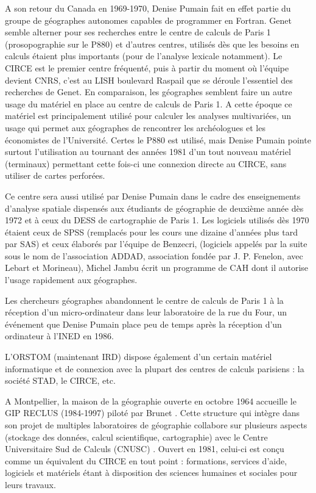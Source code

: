 A son retour du Canada en 1969-1970, Denise Pumain fait en effet partie du groupe de géographes autonomes capables de programmer en Fortran. Genet semble alterner pour ses recherches entre le centre de calculs de Paris 1 (prosopographie sur le P880) et d'autres centres, utilisés dès que les besoins en calculs étaient plus importants (pour de l'analyse lexicale notamment). Le  CIRCE est le premier centre fréquenté, puis à partir du moment où l'équipe devient CNRS, c'est au LISH boulevard Raspail que se déroule l'essentiel des recherches de Genet. En comparaison, les géographes semblent faire un autre usage du matériel en place au centre de calculs de Paris 1. A cette époque ce matériel est principalement utilisé pour calculer les analyses multivariées, un usage qui permet aux géographes de rencontrer les archéologues et les économistes de l'Université. Certes le P880 est utilisé, mais Denise Pumain pointe surtout l'utilisation au tournant des années 1981 d'un tout nouveau matériel (terminaux) permettant cette fois-ci une connexion directe au CIRCE, sans utiliser de cartes perforées.

Ce centre sera aussi utilisé par Denise Pumain dans le cadre des enseignements d'analyse spatiale dispensés aux étudiants de géographie de deuxième année dès 1972 et à ceux du DESS de cartographie de Paris 1. Les logiciels utilisés dès 1970 étaient ceux de SPSS (remplacés pour les cours une dizaine d'années plus tard par SAS) et ceux élaborés par l'équipe de Benzecri, (logiciels appelés par la suite sous le nom de l'association ADDAD, association fondée par J. P. Fenelon, avec Lebart et Morineau), Michel Jambu écrit un programme de CAH dont il autorise l'usage rapidement aux géographes.

Les chercheurs géographes abandonnent le centre de calculs de Paris 1 à la réception d'un micro-ordinateur dans leur laboratoire de la rue du Four, un événement que Denise Pumain place peu de temps après la réception d'un ordinateur à l'INED en 1986.

L’ORSTOM (maintenant IRD) dispose également d’un certain matériel informatique et de connexion avec la plupart des centres de calculs parisiens : la société STAD, le CIRCE, etc. \autocite{Dejardin1992}

A Montpellier, la maison de la géographie ouverte en octobre 1964 accueille le GIP RECLUS (1984-1997) piloté par Brunet \autocite{Brunet1988}. Cette structure qui intègre dans son projet de multiples laboratoires de géographie collabore sur plusieurs aspects (stockage des données, calcul scientifique, cartographie) avec le Centre Universitaire Sud de Calculs (CNUSC) \autocite{Waniez2010}. Ouvert en 1981, celui-ci est conçu comme un équivalent du CIRCE en tout point : formations, services d’aide, logiciels et matériels étant à disposition des sciences humaines et sociales pour leurs travaux.

